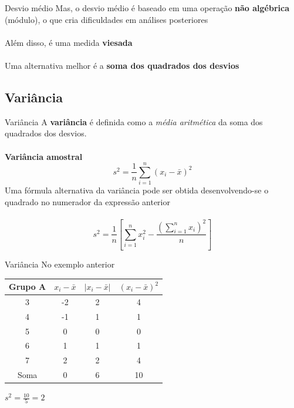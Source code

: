 \documentclass[10pt]{beamer}\usepackage[]{graphicx}\usepackage[]{color}
\theoremstyle{definition}
\begin{document}
\begin{frame}{Desvio médio}
  Mas, o desvio médio é baseado em uma operação \textbf{não algébrica}
  (módulo), o que cria dificuldades em análises posteriores \\~\\
  Além disso, é uma medida \textbf{viesada} \\~\\
  Uma alternativa melhor é a \textbf{soma dos quadrados dos desvios}
\end{frame}

\subsection{Variância}

\begin{frame}{Variância}
  A \textbf{variância} é definida como a \textit{média aritmética} da
  soma dos quadrados dos desvios.\\~\\
  \textbf{Variância amostral}
  \begin{equation*}
    s^2 = \frac{1}{n} \sum_{i=1}^{n} (x_i - \bar{x})^2
  \end{equation*}
  Uma fórmula alternativa da variância pode ser obtida desenvolvendo-se
  o quadrado no numerador da expressão anterior \\~\\
  \begin{equation*}
    s^2 = \frac{1}{n} \left[ \sum_{i=1}^{n} x_{i}^{2} -
    \frac{(\sum_{i=1}^{n} x_i)^2}{n} \right]
  \end{equation*}
\end{frame}

\begin{frame}{Variância}
  No exemplo anterior
    \begin{table}[htbp]
    \centering
    \begin{tabular}{cccc}
      \hline
      \textbf{Grupo A} & $x_i - \bar{x}$ & $|x_i - \bar{x}|$ & $(x_i -
      \bar{x})^2$ \\ \hline
      3 & -2 & 2 & 4 \\
      4 & -1 & 1 & 1\\
      5 & 0 & 0 & 0\\
      6 & 1 & 1 & 1\\
      7 & 2 & 2 & 4\\
      \hline
      Soma & 0 & 6 & 10\\
      \hline
    \end{tabular}
  \end{table}
  $s^2 = \frac{10}{5} = 2$ \\~\\
\end{frame}
\end{document}
